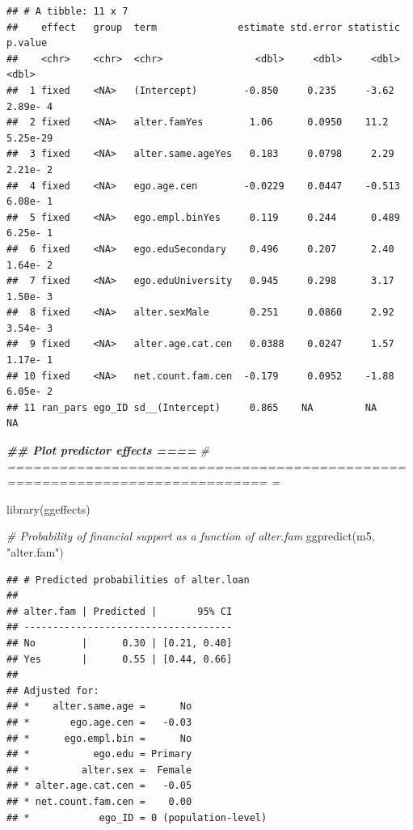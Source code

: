 \documentclass[
]{book}
\newenvironment{Shaded}{\begin{snugshade}}{\end{snugshade}}
\newcommand{\CommentTok}[1]{\textcolor[rgb]{0.56,0.35,0.01}{\textit{#1}}}
\newcommand{\DocumentationTok}[1]{\textcolor[rgb]{0.56,0.35,0.01}{\textbf{\textit{#1}}}}
\newcommand{\FunctionTok}[1]{\textcolor[rgb]{0.00,0.00,0.00}{#1}}
\newcommand{\NormalTok}[1]{#1}
\newcommand{\StringTok}[1]{\textcolor[rgb]{0.31,0.60,0.02}{#1}}
\begin{document}
\begin{verbatim}
## # A tibble: 11 x 7
##    effect   group  term              estimate std.error statistic   p.value
##    <chr>    <chr>  <chr>                <dbl>     <dbl>     <dbl>     <dbl>
##  1 fixed    <NA>   (Intercept)        -0.850     0.235     -3.62   2.89e- 4
##  2 fixed    <NA>   alter.famYes        1.06      0.0950    11.2    5.25e-29
##  3 fixed    <NA>   alter.same.ageYes   0.183     0.0798     2.29   2.21e- 2
##  4 fixed    <NA>   ego.age.cen        -0.0229    0.0447    -0.513  6.08e- 1
##  5 fixed    <NA>   ego.empl.binYes     0.119     0.244      0.489  6.25e- 1
##  6 fixed    <NA>   ego.eduSecondary    0.496     0.207      2.40   1.64e- 2
##  7 fixed    <NA>   ego.eduUniversity   0.945     0.298      3.17   1.50e- 3
##  8 fixed    <NA>   alter.sexMale       0.251     0.0860     2.92   3.54e- 3
##  9 fixed    <NA>   alter.age.cat.cen   0.0388    0.0247     1.57   1.17e- 1
## 10 fixed    <NA>   net.count.fam.cen  -0.179     0.0952    -1.88   6.05e- 2
## 11 ran_pars ego_ID sd__(Intercept)     0.865    NA         NA     NA
\end{verbatim}

\begin{Shaded}
\begin{Highlighting}[]
\DocumentationTok{\#\# Plot predictor effects                                                   ====}
\CommentTok{\# ============================================================================ =}

\FunctionTok{library}\NormalTok{(ggeffects)}

\CommentTok{\# Probability of financial support as a function of alter.fam}
\FunctionTok{ggpredict}\NormalTok{(m5, }\StringTok{"alter.fam"}\NormalTok{) }
\end{Highlighting}
\end{Shaded}

\begin{verbatim}
## # Predicted probabilities of alter.loan
## 
## alter.fam | Predicted |       95% CI
## ------------------------------------
## No        |      0.30 | [0.21, 0.40]
## Yes       |      0.55 | [0.44, 0.66]
## 
## Adjusted for:
## *    alter.same.age =      No
## *       ego.age.cen =   -0.03
## *      ego.empl.bin =      No
## *           ego.edu = Primary
## *         alter.sex =  Female
## * alter.age.cat.cen =   -0.05
## * net.count.fam.cen =    0.00
## *            ego_ID = 0 (population-level)
\end{verbatim}
\end{document}
